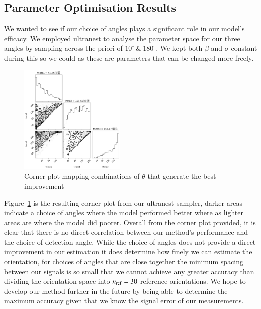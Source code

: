 \documentclass[final, 3p]{elsarticle}
\begin{document}
\subsection{Parameter Optimisation Results}
\label{sec:3.3}

We wanted to see if our choice of angles plays a significant role in
our model's efficacy. We employed ultranest to analyse the parameter
space for our three angles by sampling across the priori of
$10^{\circ} \ \& \ 180^{\circ}$.   We kept both $\beta$ and $\sigma$
constant during this so we could as these are parameters that can be
changed more freely.

\begin{figure}[h]
	\label{fig:corner}
	\centering
	\includegraphics[width=0.45\textwidth]{./Images/corneranglesfreed-1.png}
	\caption{Corner plot mapping combinations of $\theta$ that generate the best improvement}
\end{figure}

Figure~\ref{fig:corner} is the resulting corner plot from our
ultranest sampler, darker areas indicate a choice of angles where the
model performed better where as lighter areas are where the model did
poorer.  Overall from the corner plot provided, it is clear that there
is no direct correlation between our method's performance and the
choice of detection angle. While the choice of angles does not provide
a direct improvement in our estimation it does determine how finely we
can estimate the orientation, for choices of angles that are close
together the minimum spacing between our signals is so small that we
cannot achieve any greater accuracy than dividing the orientation
space into $n_{\rm ref}=30$ reference orientations.  We hope to
develop our method further in the future by being able to determine
the maximum accuracy given that we know the signal error of our
measurements.
\end{document}
